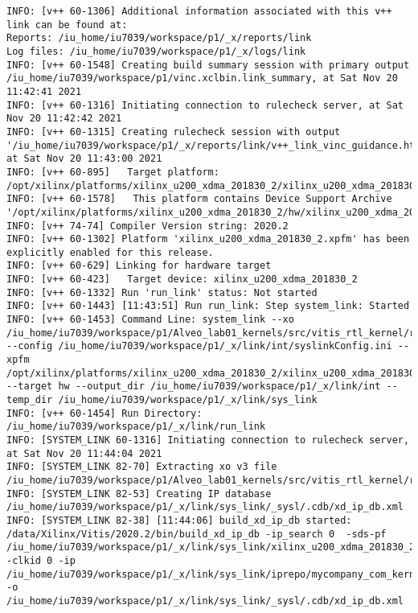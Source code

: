 \begin{lstlisting}[label=lst:lev_rec,caption=Содержимое log-файла]
INFO: [v++ 60-1306] Additional information associated with this v++ link can be found at:
Reports: /iu_home/iu7039/workspace/p1/_x/reports/link
Log files: /iu_home/iu7039/workspace/p1/_x/logs/link
INFO: [v++ 60-1548] Creating build summary session with primary output /iu_home/iu7039/workspace/p1/vinc.xclbin.link_summary, at Sat Nov 20 11:42:41 2021
INFO: [v++ 60-1316] Initiating connection to rulecheck server, at Sat Nov 20 11:42:42 2021
INFO: [v++ 60-1315] Creating rulecheck session with output '/iu_home/iu7039/workspace/p1/_x/reports/link/v++_link_vinc_guidance.html', at Sat Nov 20 11:43:00 2021
INFO: [v++ 60-895]   Target platform: /opt/xilinx/platforms/xilinx_u200_xdma_201830_2/xilinx_u200_xdma_201830_2.xpfm
INFO: [v++ 60-1578]   This platform contains Device Support Archive '/opt/xilinx/platforms/xilinx_u200_xdma_201830_2/hw/xilinx_u200_xdma_201830_2.dsa'
INFO: [v++ 74-74] Compiler Version string: 2020.2
INFO: [v++ 60-1302] Platform 'xilinx_u200_xdma_201830_2.xpfm' has been explicitly enabled for this release.
INFO: [v++ 60-629] Linking for hardware target
INFO: [v++ 60-423]   Target device: xilinx_u200_xdma_201830_2
INFO: [v++ 60-1332] Run 'run_link' status: Not started
INFO: [v++ 60-1443] [11:43:51] Run run_link: Step system_link: Started
INFO: [v++ 60-1453] Command Line: system_link --xo /iu_home/iu7039/workspace/p1/Alveo_lab01_kernels/src/vitis_rtl_kernel/rtl_kernel_wizard_0/rtl_kernel_wizard_0.xo --config /iu_home/iu7039/workspace/p1/_x/link/int/syslinkConfig.ini --xpfm /opt/xilinx/platforms/xilinx_u200_xdma_201830_2/xilinx_u200_xdma_201830_2.xpfm --target hw --output_dir /iu_home/iu7039/workspace/p1/_x/link/int --temp_dir /iu_home/iu7039/workspace/p1/_x/link/sys_link
INFO: [v++ 60-1454] Run Directory: /iu_home/iu7039/workspace/p1/_x/link/run_link
INFO: [SYSTEM_LINK 60-1316] Initiating connection to rulecheck server, at Sat Nov 20 11:44:04 2021
INFO: [SYSTEM_LINK 82-70] Extracting xo v3 file /iu_home/iu7039/workspace/p1/Alveo_lab01_kernels/src/vitis_rtl_kernel/rtl_kernel_wizard_0/rtl_kernel_wizard_0.xo
INFO: [SYSTEM_LINK 82-53] Creating IP database /iu_home/iu7039/workspace/p1/_x/link/sys_link/_sysl/.cdb/xd_ip_db.xml
INFO: [SYSTEM_LINK 82-38] [11:44:06] build_xd_ip_db started: /data/Xilinx/Vitis/2020.2/bin/build_xd_ip_db -ip_search 0  -sds-pf /iu_home/iu7039/workspace/p1/_x/link/sys_link/xilinx_u200_xdma_201830_2.hpfm -clkid 0 -ip /iu_home/iu7039/workspace/p1/_x/link/sys_link/iprepo/mycompany_com_kernel_rtl_kernel_wizard_0_1_0,rtl_kernel_wizard_0 -o /iu_home/iu7039/workspace/p1/_x/link/sys_link/_sysl/.cdb/xd_ip_db.xml

\end{lstlisting}
